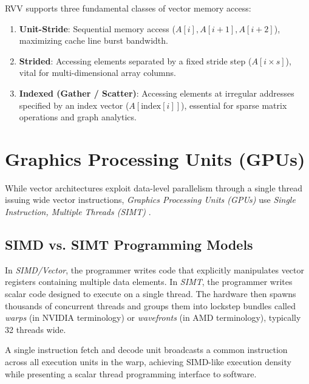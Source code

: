 RVV supports three fundamental classes of vector memory access:
\begin{enumerate}
    \item \textbf{Unit-Stride}: Sequential memory access ($A[i], A[i+1], A[i+2]$), maximizing cache line burst bandwidth.
    \item \textbf{Strided}: Accessing elements separated by a fixed stride step ($A[i \times s]$), vital for multi-dimensional array columns.
    \item \textbf{Indexed (Gather / Scatter)}: Accessing elements at irregular addresses specified by an index vector ($A[\text{index}[i]]$), essential for sparse matrix operations and graph analytics.
\end{enumerate}


\section{Graphics Processing Units (GPUs)}\label{sec:gpu_simt}

While vector architectures exploit data-level parallelism through a single thread issuing wide vector instructions, \textit{Graphics Processing Units (GPUs)} use \textit{Single Instruction, Multiple Threads (SIMT)} \cite{owens2008gpu}.

\subsection{SIMD vs. SIMT Programming Models}
In \textit{SIMD/Vector}, the programmer writes code that explicitly manipulates vector registers containing multiple data elements. In \textit{SIMT}, the programmer writes scalar code designed to execute on a single thread. The hardware then spawns thousands of concurrent threads and groups them into lockstep bundles called \textit{warps} (in NVIDIA terminology) or \textit{wavefronts} (in AMD terminology), typically 32 threads wide.

A single instruction fetch and decode unit broadcasts a common instruction across all execution units in the warp, achieving SIMD-like execution density while presenting a scalar thread programming interface to software.

